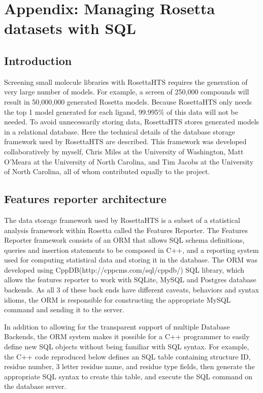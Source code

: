 \chapter{Appendix: Managing Rosetta datasets with SQL}
\label{chap:sql_appendix}
\section{Introduction}

Screening small molecule libraries with RosettaHTS requires the generation of very large number of models. 
For example, a screen of 250,000 compounds will result in 50,000,000 generated Rosetta models.
Because RosettaHTS only needs the top 1 model generated for each ligand, 99.995\% of this data will not be needed.
To avoid unnecessarily storing data, RosettaHTS stores generated models in a relational database.
Here  the technical details of the database storage framework used by RosettaHTS are described.
This framework was developed collaboratively by myself, Chris Miles at the University of Washington, Matt O'Meara at the University of North Carolina, and Tim Jacobs at the University of North Carolina, all of whom contributed equally to the project. 

\section{Features reporter architecture}

The data storage framework used by RosettaHTS is a subset of a statistical analysis framework within Rosetta called the Features Reporter.
The Features Reporter framework consists of an \ac{ORM} that allows \ac{SQL} schema definitions, queries and insertion statements to be composed in C++, and a reporting system used for computing statistical data and storing it in the database.
The \ac{ORM} was developed using CppDB(http://cppcms.com/sql/cppdb/) \ac{SQL} library, which allows the features reporter to work with SQLite, MySQL and Postgres database backends.
As all 3 of these back ends have different caveats, behaviors and syntax idioms, the \ac{ORM} is responsible for constructing the appropriate MySQL command and sending it to the server.

In addition to allowing for the transparent support of multiple Database Backends, the \ac{ORM} system makes it possible for a C++ programmer to easily define new \ac{SQL} objects without being familiar with \ac{SQL} syntax. 
For example, the C++ code reproduced below defines an \ac{SQL} table containing structure ID, residue number, 3 letter residue name, and residue type fields, then generate the appropriate \ac{SQL} syntax to create this table, and execute the \ac{SQL} command on the database server.

